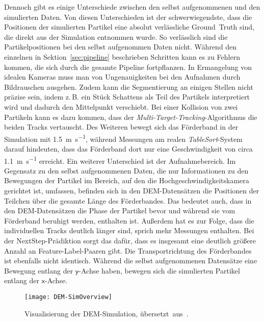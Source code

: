 Dennoch gibt es einige Unterschiede zwischen den selbst aufgenommenen und den simulierten Daten.
Von diesen Unterschieden ist der schwerwiegendste, dass die Positionen der simulierten Partikel eine absolut verlässliche Ground~Truth sind, 
die direkt aus der Simulation entnommen wurde.
So verlässlich sind die Partikelpositionen bei den selbst aufgenommen Daten nicht.
Während den einzelnen in Sektion~\ref{sec:pipeline} beschrieben Schritten kann es zu Fehlern kommen, die sich durch die gesamte Pipeline fortpflanzen.
In Ermangelung von idealen Kameras muss man von Ungenauigkeiten bei den Aufnahmen durch Bildrauschen ausgehen.
Zudem kann die Segmentierung an einigen Stellen nicht präzise sein, indem z.\,B. ein Stück Schattens als Teil des Partikels interpretiert wird und dadurch den Mittelpunkt verschiebt. 
Bei einer Kollision von zwei Partikeln kann es dazu kommen, dass der \textit{Multi-Target-Tracking}-Algorithmus die beiden Tracks vertauscht.  
Des Weiteren bewegt sich das Förderband in der Simulation mit \SI{1.5}{\meter\per\second}, 
während Messungen am realen \textit{TableSort}-System darauf hindeuten, dass das Förderband dort nur eine Geschwindigkeit von 
circa \SI{1.1}{\meter\per\second} erreicht.
Ein weiterer Unterschied ist der Aufnahmebereich.
Im Gegensatz zu den selbst aufgenommenen Daten, die nur Informationen 
zu den Bewegungen der Partikel im Bereich, auf den die Hochgeschwindigkeitskamera gerichtet ist, umfassen, 
befinden sich in den DEM-Datensätzen die Positionen der Teilchen über die gesamte Länge des Förderbandes.
Das bedeutet auch, dass in den DEM-Datensätzen die Phase der Partikel bevor und während sie vom Förderband beruhigt werden, enthalten ist.
Außerdem hat es zur Folge, dass die individuellen Tracks deutlich länger sind, sprich mehr Messungen enthalten.
Bei der NextStep-Prädiktion sorgt das dafür, dass es insgesamt eine deutlich größere Anzahl an Feature-Label-Paaren gibt.
Die Transportrichtung des Förderbandes ist ebenfalls nicht identisch.
Während die selbst aufgenommenen Datensätze eine Bewegung entlang der \(\mathsf{y}\)-Achse haben, bewegen sich die simulierten Partikel entlang der \(\mathsf{x}\)-Achse.

\begin{figure}[h]
    \centering
	\texttt{[image: DEM-SimOverview]}
	\caption{Visualisierung der DEM-Simulation, übersetzt~aus~\cite{Pfaff2018}.}
	\label{fig:DEMSimulation}
\end{figure}




